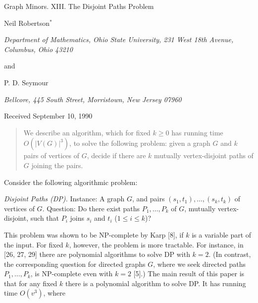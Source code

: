 {\centering
{\Large Graph Minors. XIII. The Disjoint Paths Problem\par}\medskip

Neil Robertson$^*$\par
\textit{Department of Mathematics, Ohio State University, 231 West 18th Avenue, Columbus, Ohio 43210}\par
and\par
P. D. Seymour\par
\textit{Bellcore, 445 South Street, Morristown, New Jersey 07960}\par
Received September 10, 1990\par
}
\begin{quote}
We describe an algorithm, which for fixed $k \ge 0$ has running time $O(|V(G)|^3)$, to solve the following problem: given a graph $G$ and $k$ pairs of vertices of $G$, decide if there are $k$ mutually vertex-disjoint paths of $G$ joining the pairs.

\end{quote}


Consider the following algorithmic problem:

\textit{Disjoint Paths (DP).} Instance: A graph $G$, and pairs $(s_1, t_1), \dots, (s_k, t_k)$ of vertices of $G$. Question: Do there exist paths $P_1, \dots, P_k$ of $G$, mutually vertex-disjoint, such that $P_i$ joins $s_i$ and $t_i$ ($1 \le i \le k$)?

This problem was shown to be NP-complete by Karp [8], if $k$ is a variable part of the input. For fixed $k$, however, the problem is more tractable. For instance, in [26, 27, 29] there are polynomial algorithms to solve DP with $k = 2$. (In contrast, the corresponding question for directed graphs $G$, where we seek directed paths $P_1, \dots, P_k$, is NP-complete even with $k = 2$ [5].) The main result of this paper is that for any fixed $k$ there is a polynomial algorithm to solve DP. It has running time $O(v^3)$, where%
